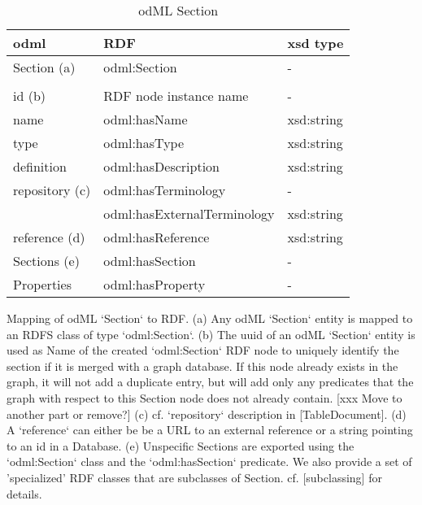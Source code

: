 \documentclass{article}
\begin{document}
\begin{table}
\begin{threeparttable}
\caption{odML Section}
\begin{tabular}{l|l|l}
    odml            & RDF                             & xsd type \\
\hline
    Section (a)     & odml:Section                    & - \\
                    & & \\
    id (b)          & RDF node instance name          & - \\
    name            & odml:hasName                    & xsd:string \\
    type            & odml:hasType                    & xsd:string \\
    definition      & odml:hasDescription             & xsd:string \\
    repository (c)  & odml:hasTerminology             & - \\
                    & odml:hasExternalTerminology     & xsd:string \\
    reference (d)   & odml:hasReference               & xsd:string \\
    Sections (e)    & odml:hasSection                 & - \\
    Properties      & odml:hasProperty                & - \\

\end{tabular}
\begin{tablenotes}
\item Mapping of odML `Section` to RDF. (a) Any odML `Section` entity is mapped to an RDFS class of type `odml:Section`. (b) The uuid of an odML `Section` entity is used as Name of the created `odml:Section` RDF node to uniquely identify the section if it is merged with a graph database. If this node already exists in the graph, it will not add a duplicate entry, but will add only any predicates that the graph with respect to this Section node does not already contain. [xxx Move to another part or remove?] (c) cf. `repository` description in [TableDocument]. (d) A `reference` can either be be a URL to an external reference or a string pointing to an id in a Database. (e) Unspecific Sections are exported using the `odml:Section` class and the `odml:hasSection` predicate. We also provide a set of 'specialized' RDF classes that are subclasses of Section. cf. [subclassing] for details.
\end{tablenotes}
\end{threeparttable}
\end{table}
\end{document}
